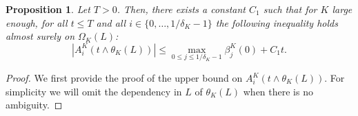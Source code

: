\documentclass[10pt]{amsart}
\theoremstyle{plain}
\newtheorem{prop}[theorem]{Proposition}
\theoremstyle{remark}
\begin{document}
\begin{prop}
\label{est-varpart}
Let $T>0$. Then, there exists a constant $C_1$ such that for $K$ large enough, for all $t\leq T$ and all $i\in\{0,\ldots,1/\delta_K-1\}$ the following inequality holds almost surely on $\Omega_K(L)$:\vspace*{-3pt}\enlargethispage{\baselineskip}
\begin{equation*}
|A^K_i(t\wedge \theta_K(L)) |\leq \max_{0\leq j\leq 1/\delta_K-1}\beta^K_j(0) + C_1 t.
\end{equation*}
\end{prop}

\begin{proof}
We first provide the proof of the upper bound on $A_i^K(t\wedge \theta_K(L))$. For simplicity we will omit the dependency in $L$ of $\theta_K(L)$ when there is no ambiguity.


\end{proof}
\end{document}
